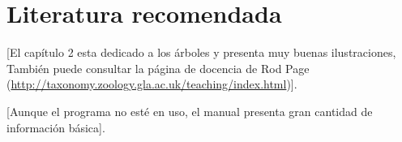 
\section*{Literatura recomendada}

\cite{PageHolmes1998} [El cap\'itulo 2 esta dedicado a los \'arboles y presenta muy buenas ilustraciones, Tambi\'en puede consultar la p\'agina de docencia de Rod Page (\url{http://taxonomy.zoology.gla.ac.uk/teaching/index.html})].

\cite{McClade4} [Aunque el programa no est\'e en uso, el manual presenta gran cantidad de informaci\'on b\'asica].


